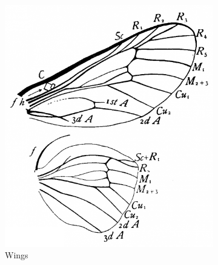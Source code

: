 \documentclass[letterpaper, 11pt]{article}
\begin{document}
\begin{figure}[ht!]
    \centering
    \begin{subfigure}[ht!]{0.36\textwidth}
        \includegraphics[width=\textwidth]{PsychidWings}
        \caption{Wings \citep[Fig. 46]{comstock1918wings}}
        \label{fig:psychid1}
    \end{subfigure}
    ~ %
    \begin{subfigure}[ht!]{0.15\textwidth}

\end{subfigure}
\end{figure}
\end{document}
